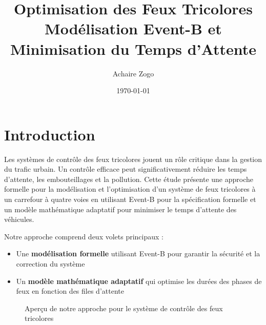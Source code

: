 \documentclass[11pt,a4paper]{article}
\title{\LARGE\textbf{Optimisation des Feux Tricolores\\\vspace{0.5em}\normalsize{Modélisation Event-B et Minimisation du Temps d'Attente}}}
\author{Achaire Zogo}
\date{\today}
\begin{document}
\maketitle
\tableofcontents
\newpage

\section{Introduction}
\label{sec:introduction}

Les systèmes de contrôle des feux tricolores jouent un rôle critique dans la gestion du trafic urbain. Un contrôle efficace peut significativement réduire les temps d'attente, les embouteillages et la pollution. Cette étude présente une approche formelle pour la modélisation et l'optimisation d'un système de feux tricolores à un carrefour à quatre voies en utilisant Event-B pour la spécification formelle et un modèle mathématique adaptatif pour minimiser le temps d'attente des véhicules.

Notre approche comprend deux volets principaux :
\begin{itemize}
    \item Une \textbf{modélisation formelle} utilisant Event-B pour garantir la sécurité et la correction du système
    \item Un \textbf{modèle mathématique adaptatif} qui optimise les durées des phases de feux en fonction des files d'attente
\end{itemize}

\begin{figure}[h]
\centering
{}
\caption{Aperçu de notre approche pour le système de contrôle des feux tricolores}
\label{fig:overview}
\end{figure}
\end{document}
